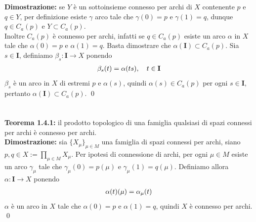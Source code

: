 \documentclass{article}
\begin{document}
\textbf{Dimostrazione:} se $Y$ è un sottoinsieme connesso per archi di $X$ contenente $p$ e $q \in Y$, per definizione esiste $\gamma$ arco tale che $\gamma(0) = p$ e $\gamma(1) = q$, dunque $q \in C_a(p)$ e $Y \subset C_a(p)$. \\
Inoltre $C_a(p)$ è connesso per archi, infatti se $q \in C_a(p)$ esiste un arco $\alpha$ in $X$ tale che $\alpha(0) = p$ e $\alpha(1) = q$. Basta dimostrare che $\alpha(\mathbf{I}) \subset C_a(p)$. Sia $s \in \mathbf{I}$, definiamo $\beta_s : \mathbf{I} \longrightarrow X$ ponendo
\begin{gather}
    \beta_s(t) = \alpha(ts), \quad t \in \mathbf{I} \notag
\end{gather}
$\beta_s$ è un arco in $X$ di estremi $p$ e $\alpha(s)$, quindi $\alpha(s) \in C_a(p)$ per ogni $s \in \mathbf{I}$, pertanto $\alpha(\mathbf{I}) \subset C_a(p)$. \qed \\ \\ \\
\textbf{Teorema 1.4.1:} il prodotto topologico di una famiglia qualsiasi di spazi connessi per archi è connesso per archi. \\

\textbf{Dimostrazione:} sia $\{ X_\mu \}_{\mu \in M}$ una famiglia di spazi connessi per archi, siano $p, q \in X := \prod_{\mu \in M} X_\mu$. Per ipotesi di connessione di archi, per ogni $\mu \in M$ esiste un arco $\gamma_\mu$ tale che $\gamma_\mu(0) = p(\mu)$ e $\gamma_\mu(1) = q(\mu)$. Definiamo allora $\alpha : \mathbf{I} \longrightarrow X$ ponendo
\begin{gather}
    \alpha(t)(\mu) = \alpha_\mu(t) \notag
\end{gather}
$\alpha$ è un arco in $X$ tale che $\alpha(0) = p$ e $\alpha(1) = q$, quindi $X$ è connesso per archi. \qed
\end{document}
